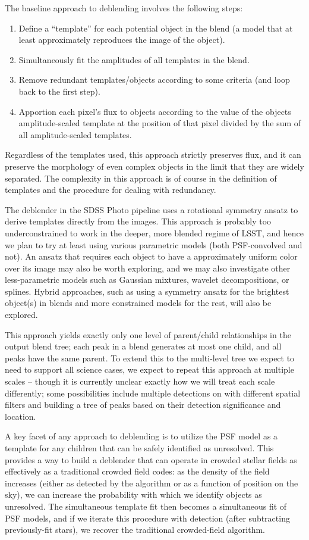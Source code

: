 The baseline approach to deblending involves the following steps:
\begin{enumerate}
\item Define a ``template'' for each potential object in the blend (a model that at least approximately reproduces the image of the object).
\item Simultaneously fit the amplitudes of all templates in the blend.
\item Remove redundant templates/objects according to some criteria (and loop back to the first step).
\item Apportion each pixel's flux to objects according to the value of the objects amplitude-scaled template at the position of that pixel divided by the sum of all amplitude-scaled templates.
\end{enumerate}
Regardless of the templates used, this approach strictly preserves flux, and it can preserve the morphology of even complex objects in the limit that they are widely separated.  The complexity in this approach is of course in the definition of templates and the procedure for dealing with redundancy.

The deblender in the SDSS Photo pipeline uses a rotational symmetry ansatz to derive templates directly from the images.  This approach is probably too underconstrained to work in the deeper, more blended regime of LSST, and hence we plan to try at least using various parametric models (both PSF-convolved and not).  An ansatz that requires each object to have a approximately uniform color over its image may also be worth exploring, and we may also investigate other less-parametric models such as Gaussian mixtures, wavelet decompositions, or splines.  Hybrid approaches, such as using a symmetry ansatz for the brightest object(s) in blends and more constrained models for the rest, will also be explored.

This approach yields exactly only one level of parent/child relationships in the output blend tree; each peak in a blend generates at most one child, and all peaks have the same parent.  To extend this to the multi-level tree we expect to need to support all science cases, we expect to repeat this approach at multiple scales -- though it is currently unclear exactly how we will treat each scale differently; some possibilities include multiple detections on with different spatial filters and building a tree of peaks based on their detection significance and location.

A key facet of any approach to deblending is to utilize the PSF model as a template for any children that can be safely identified as unresolved.  This provides a way to build a deblender that can operate in crowded stellar fields as effectively as a traditional crowded field codes: as the density of the field increases (either as detected by the algorithm or as a function of position on the sky), we can increase the probability with which we identify objects as unresolved.  The simultaneous template fit then becomes a simultaneous fit of PSF models, and if we iterate this procedure with detection (after subtracting previously-fit stars), we recover the traditional crowded-field algorithm.

